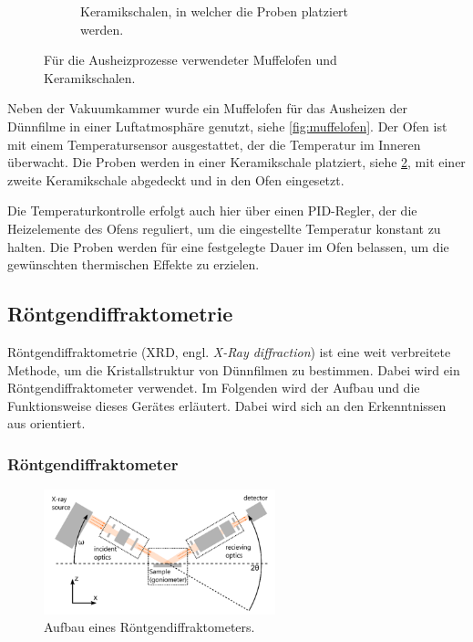 \begin{figure}
\begin{subfigure}[t]{0.35\textwidth}
        \caption{Keramikschalen, in welcher die Proben platziert werden.}
        \label{fig:schale}
    \end{subfigure}
    \caption{Für die Ausheizprozesse verwendeter Muffelofen und Keramikschalen.}
\end{figure}
Neben der Vakuumkammer wurde ein Muffelofen für das Ausheizen der Dünnfilme in einer Luftatmosphäre genutzt,
siehe \cref{fig:muffelofen}.
Der Ofen ist mit einem Temperatursensor ausgestattet, der die Temperatur im Inneren überwacht.
Die Proben werden in einer Keramikschale platziert, siehe \cref{fig:schale}, mit einer zweite
Keramikschale abgedeckt und in den Ofen eingesetzt.

Die Temperaturkontrolle erfolgt auch hier über einen PID-Regler, der die Heizelemente des Ofens reguliert, um
die eingestellte Temperatur konstant zu halten.
Die Proben werden für eine festgelegte Dauer im Ofen belassen, um die gewünschten thermischen Effekte zu erzielen.

\subsection{Röntgendiffraktometrie}\label{subsec:xrd}
Röntgendiffraktometrie (XRD, engl. \textit{X-Ray diffraction}) ist eine weit verbreitete Methode, um die
Kristallstruktur von Dünnfilmen zu bestimmen.
Dabei wird ein Röntgendiffraktometer verwendet.
Im Folgenden wird der Aufbau und die Funktionsweise dieses Gerätes erläutert.
Dabei wird sich an den Erkenntnissen aus  \autocite{btb-xrd} orientiert.

\subsubsection{Röntgendiffraktometer}

\begin{figure}
    \centering
    \includegraphics[width=0.6\textwidth]{../assets/messmethoden/xrd/img}
    \caption{Aufbau eines Röntgendiffraktometers. }
    \label{fig:xrd}
\end{figure}

